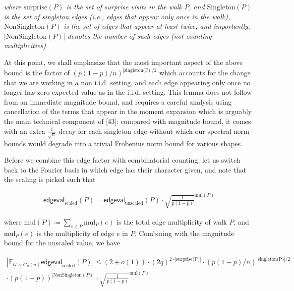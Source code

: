 \documentclass[10pt,a4paper]{article}
\begin{document}
\emph{where $\text{surprise}(P)$ is the set of surprise visits in the walk $P$, and $\text{Singleton}(P)$ is the set of singleton edges (i.e., edges that appear only once in the walk), $\text{NonSingleton}(P)$ is the set of edges that appear at least twice, and importantly, $|\text{NonSingleton}(P)|$ denotes the number of such edges (not counting multiplicities).}\par






At this point, we shall emphasize that the most important aspect of the above bound is the factor of $(p(1-p)/n)^{|\text{singleton(P)}|/2}$ which accounts for the change that we are working in a non i.i.d. setting, and each edge appearing only once no longer has zero expected value as in the i.i.d. setting. This lemma does not follow from an immediate magnitude bound, and requires a careful analysis using cancellation of the terms that appear in the moment expansion which is arguably the main technical component of [43]: compared with magnitude bound, it comes with an extra $\frac{1}{\sqrt{n}}$ decay for each singleton edge without which our spectral norm bounds would degrade into a trivial Frobenius norm bound for various shapes.\par




Before we combine this edge factor with combinatorial counting, let us switch back to the Fourier basis in which edge has their character given, and note that the scaling is picked such that\par


\[\begin{gathered}
\mathsf{edgeval}_{\text{scaled}}(P)=\mathsf{edgeval}_{\text{unscaled}}(P)\cdot\sqrt{\frac{1}{p(1-p)}}^{\text{mul}(P)}
\end{gathered}\]


where $\text{mul}(P)\coloneqq\sum_{e\in P}\text{mul}_{P}(e)$ is the total edge multiplicity of walk $P$, and $\text{mul}_{P}(e)$ is the multiplicity of edge $e$ in $P$. Combining with the magnitude bound for the unscaled value, we have\par




\[\begin{gathered}
\displaystyle\left|\mathbb{E}_{G\sim G_{d}(n)}\mathsf{edgeval}_{\text{scaled}}(P)\right|\leq \displaystyle(2+o(1))\cdot(2q)^{2\cdot|\text{surprise(P)}|}\cdot(p(1-p)/n)^{|\text{singleton(P)}|/2} \\
\displaystyle\cdot(p(1-p))^{|\text{NonSingleton}(P)|}\cdot\sqrt{\frac{1}{p(1-p)}}^{\text{mul}(P)}
\end{gathered}\]
\end{document}
